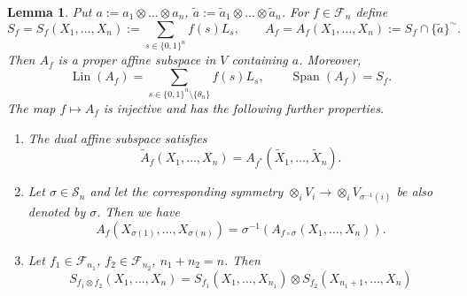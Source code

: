 \documentclass[12pt]{article}
\newtheorem{lemma}{Lemma}
\theoremstyle{definition}
\theoremstyle{remark}
\def\lin{\operatorname{Lin}}
\def\Span{\operatorname{Span}}
\def\Fe{\mathcal F}
\def\permut{\mathscr{S}}
\begin{document}
\begin{lemma}\label{lemma:Xf} Put $a:= a_1\otimes\dots \otimes  a_n$, $\tilde a:= \tilde
a_1\otimes\dots\otimes  \tilde a_n$.
For  $f\in \Fe_n$ define 
\[
S_f=S_f(X_1,\dots,X_n):=\sum_{s\in \{0,1\}^n} f(s)L_s,\qquad A_f=A_f(X_1,\dots,X_n):=S_f\cap \{\tilde a\}^\sim.
\]
Then $A_f$ is a proper affine subspace in $V$ containing $a$. Moreover,
\[
\lin(A_f)=\sum_{s\in\{0,1\}^n\setminus\{\theta_n\}} f(s)L_s,\qquad \Span(A_f)=S_f.
\]
The map $f\mapsto A_f $ is injective and has  the following further properties.
\begin{enumerate}
\item[(i)] The dual affine subspace satisfies  
\[
\tilde A_f(X_1,\dots,X_n)=A_{f^*}(\tilde X_1,\dots, \tilde X_n).
\]
\item[(ii)] Let $\sigma\in \permut_n$ and let the corresponding symmetry $\otimes_i V_i\to
\otimes_i V_{\sigma^{-1}(i)}$ be also denoted by $\sigma$. Then we have
\[
A_f(X_{\sigma(1)},\dots,X_{\sigma(n)})=\sigma^{-1}(A_{f\circ\sigma}(X_1,\dots,X_n)).
\]
\item[(iii)] Let $f_1\in \Fe_{n_1}$, $f_2\in \Fe_{n_2}$, $n_1+n_2=n$. Then
\[
S_{f_1\otimes f_2}(X_1,\dots,X_n)=S_{f_1}(X_1,\dots,X_{n_1})\otimes
S_{f_2}(X_{n_1+1},\dots, X_n)
\]
\end{enumerate}



\end{lemma}
\end{document}
